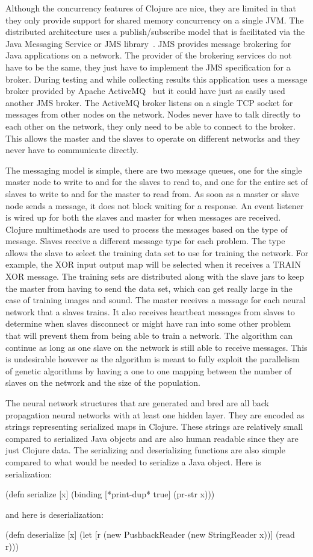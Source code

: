 Although the concurrency features of Clojure are nice, they are limited in that they only provide support for shared memory concurrency on a single JVM. The distributed architecture uses a publish/subscribe model that is facilitated via the Java Messaging Service or JMS library~\cite{jms}. JMS provides message brokering for Java applications on a network. The provider of the brokering services do not have to be the same, they just have to implement the JMS specification for a broker. During testing and while collecting results this application uses a message broker provided by Apache ActiveMQ~\cite{activeMQ} but it could have just as easily used another JMS broker. The ActiveMQ broker listens on a single TCP socket for messages from other nodes on the network. Nodes never have to talk directly to each other on the network, they only need to be able to connect to the broker. This allows the master and the slaves to operate on different networks and they never have to communicate directly.

The messaging model is simple, there are two message queues, one for the single master node to write to and for the slaves to read to, and one for the entire set of slaves to write to and for the master to read from. As soon as a master or slave node sends a message, it does not block waiting for a response. An event listener is wired up for both the slaves and master for when messages are received. Clojure multimethods are used to process the messages based on the type of message. Slaves receive a different message type for each problem. The type allows the slave to select the training data set to use for training the network. For example, the XOR input output map will be selected when it receives a TRAIN XOR message. The training sets are distributed along with the slave jars to keep the master from having to send the data set, which can get really large in the case of training images and sound. The master receives a message for each neural network that a slaves trains. It also receives heartbeat messages from slaves to determine when slaves disconnect or might have ran into some other problem that will prevent them from being able to train a network. The algorithm can continue as long as one slave on the network is still able to receive messages. This is undesirable however as the algorithm is meant to fully exploit the parallelism of genetic algorithms by having a one to one mapping between the number of slaves on the network and the size of the population. 

The neural network structures that are generated and bred are all back propagation neural networks with at least one hidden layer. They are encoded as strings representing serialized maps in Clojure. These strings are relatively small compared to serialized Java objects and are also human readable since they are just Clojure data. The serializing and deserializing functions are also simple compared to what would be needed to serialize a Java object. Here is serialization: 

(defn serialize [x]
  (binding [*print-dup* true] (pr-str x)))

and here is deserialization:

(defn deserialize [x]
  (let [r (new PushbackReader (new StringReader x))]
    (read r)))


